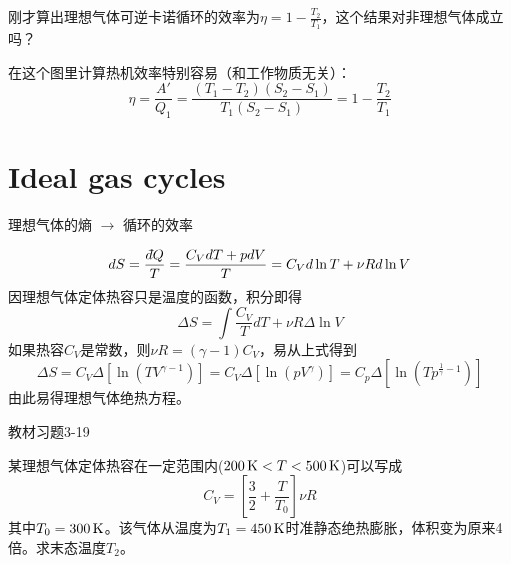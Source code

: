 \documentclass[CJK]{beamer}
\begin{document}
\begin{frame}
\bch
刚才算出理想气体可逆卡诺循环的效率为$\eta = 1-\frac{T_2}{T_1}$，这个结果对非理想气体成立吗？
\ech
\end{frame}

\begin{frame}
\bch
{}

在这个图里计算热机效率特别容易（和工作物质无关）：
$$\eta = \frac{A'}{Q_1} = \frac{(T_1-T_2)(S_2-S_1)}{T_1(S_2-S_1)} = 1- \frac{T_2}{T_1}$$

\ech
\end{frame}

\section{Ideal gas cycles}

\begin{frame}
\bch

理想气体的熵 $\rightarrow$ 循环的效率


\ech
\end{frame}

\begin{frame}
\bch
{\blue
$$ dS = \frac{\dbar Q}{T} = \frac{C_VdT +  p dV}{T} = C_Vd\ln T+ \nu R d\ln V $$}
因理想气体定体热容只是温度的函数，积分即得
$$\Delta S = \int \frac{C_V}{T} dT + \nu R \Delta \ln V$$
如果热容$C_V$是常数，则$\nu R = (\gamma-1)C_V$，易从上式得到
$$ \Delta S =  C_V \Delta \left[\ln\left(TV^{\gamma-1}\right) \right] =C_V \Delta \left[\ln\left(pV^\gamma\right) \right] = C_p \Delta \left[\ln\left(Tp^{\frac{1}{\gamma}-1}\right) \right]$$
由此易得理想气体绝热方程。
\ech
\end{frame}

\begin{frame}
\bch
{}
教材习题3-19

\ech
\end{frame}


\begin{frame}
\bch
{}
某理想气体定体热容在一定范围内($200\,\mathrm{K}<T<500\,\mathrm{K}$)可以写成
$$ C_V = \left[\frac{3}{2} + \frac{T}{T_0}\right]\nu R $$
其中$T_0 = 300\,\mathrm{K}$。该气体从温度为$T_1= 450\,\mathrm{K}$时准静态绝热膨胀，体积变为原来4倍。求末态温度$T_2$。
\ech
\end{frame}
\end{document}
